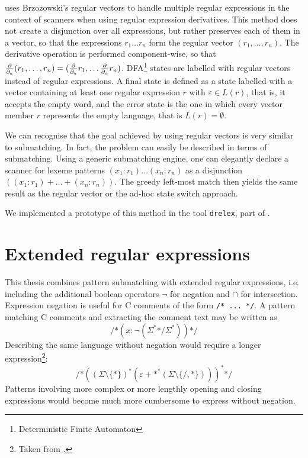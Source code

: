 \cite{re-deriv} uses Brzozowski's regular vectors to handle multiple regular
expressions in the context of scanners when using regular expression
derivatives. This method does not create a disjunction over all expressions, but
rather preserves each of them in a vector, so that the expressions $r_1 \dots
r_n$ form the regular vector $(r_1, \dots, r_n)$. The derivative operation is
performed component-wise, so that $\frac{\partial}{\partial_{a}}(r_1, \dots, r_n) = (\frac{\partial}{\partial_{a}} r_1, \dots \frac{\partial}{\partial_{a}}
r_n)$. DFA\footnote{Deterministic Finite Automaton} states are labelled with
regular vectors instead of regular expressions. A final state is defined as a
state labelled with a vector containing at least one regular expression $r$ with
$\varepsilon \in L(r)$, that is, it accepts the empty word, and the error state
is the one in which every vector member $r$ represents the empty language, that
is $L(r) = \emptyset$.

We can recognise that the goal achieved by using regular vectors is very similar
to submatching. In fact, the problem can easily be described in terms of
submatching. Using a generic submatching engine, one can elegantly declare a
scanner for lexeme patterns $(x_1:r_1) \dots (x_n:r_n)$ as a disjunction
$((x_1:r_1) + \dots + (x_n:r_n))$. The greedy left-most match then yields the
same result as the regular vector or the ad-hoc state switch approach.

We implemented a prototype of this method in the tool \texttt{drelex}, part of
\dreml.


\section{Extended regular expressions}

This thesis combines pattern submatching with extended regular expressions,
i.e. including the additional boolean operators $\neg$ for negation and $\cap$
for intersection. Expression negation is useful for C comments of the form
\verb!/* ... */!. A pattern matching C comments and extracting the comment text
may be written as
\[
  \texttt{/*}(x:\neg(\Sigma^*\texttt{*/}\Sigma^*))\texttt{*/}
\]
Describing the same language without negation would require a longer
expression\footnote{Taken from \cite{re-deriv}.}:
\[
  \texttt{/*}
  (
    (\Sigma \setminus \{*\})^*
    (\varepsilon + \texttt{*}^* (\Sigma \setminus \{\texttt{/}, \texttt{*}\}))
  )^*
  \texttt{*/}
\]
Patterns involving more complex or more lengthly opening and closing expressions
would become much more cumbersome to express without negation.

